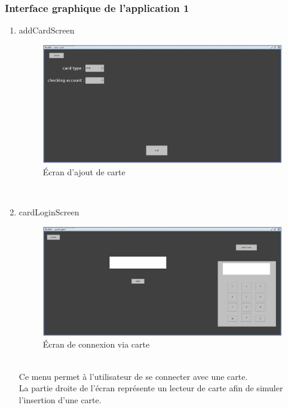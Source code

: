 \documentclass[../rapport.tex]{subfiles}
\begin{document}
\subsubsection{Interface graphique de l'application 1}
\begin{enumerate}
	\item{addCardScreen}\\
	\begin{figure}[h!]
		\centering\includegraphics[scale=0.15]{ressources/photos_diagrammes/extensionTheo/gui1/addCard.jpg}
		\caption{Écran d'ajout de carte}
	\end{figure}\\

	\item{cardLoginScreen}\\
	\begin{figure}[h!]
		\centering\includegraphics[scale=0.15]{ressources/photos_diagrammes/extensionTheo/gui1/cardLogin.jpg}
		\caption{Écran de connexion via carte}
	\end{figure}\\

Ce menu permet à l'utilisateur de se connecter avec une carte.\\
La partie droite de l'écran représente un lecteur de carte afin de simuler l'insertion d'une carte.


\end{enumerate}
\end{document}
